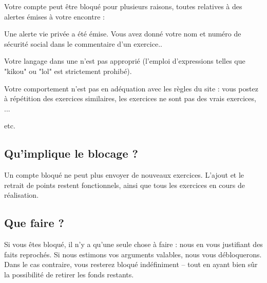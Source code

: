 ﻿Votre compte peut être bloqué pour plusieurs raisons, toutes relatives à des alertes émises à votre encontre :
\item Une alerte vie privée a été émise. Vous avez donné votre nom et numéro de sécurité social dans le commentaire d'un exercice..
\item Votre langage dans une  n'est pas approprié (l'emploi d'expressions telles que "kikou" ou "lol" est strictement prohibé).
\item Votre comportement n'est pas en adéquation avec les règles du site : vous postez à répétition des exercices similaires, les exercices ne sont pas des vrais exercices, ...
\item etc.

\subsection{Qu'implique le blocage ?}
Un compte bloqué ne peut plus envoyer de nouveaux exercices.
L'ajout et le retrait de points restent fonctionnels, ainsi que tous les exercices en cours de réalisation.

\subsection{Que faire ?}
Si vous êtes bloqué, il n'y a qu'une seule chose à faire : nous  en vous justifiant des faits reprochés. Si nous estimons vos arguments valables, nous vous débloquerons. Dans le cas contraire, vous resterez bloqué indéfiniment -- tout en ayant bien sûr la possibilité de retirer les fonds restants.